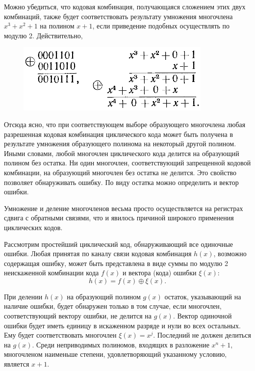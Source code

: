 \documentclass[12pt,a4paper]{article}
\begin{document}
  Можно убедиться, что кодовая комбинация, получающаяся сложением этих двух комбинаций, также будет соответствовать результату умножения многочлена $x^3+x^2+1$ на полином $x+1$, если приведение подобных осуществлять по модулю 2. Действительно,
  \begin{figure}[H]
	  \centering
	  \includegraphics[scale=0.7]{ex_eq}
  \end{figure}
  Отсюда ясно, что при соответствующем выборе образующего многочлена любая разрешенная кодовая комбинация циклического кода может быть получена в результате умножения образующего полинома на некоторый другой полином. Иными словами, любой многочлен циклического кода делится на образующий полином без остатка. Ни один многочлен, соответствующий запрещенной кодовой комбинации, на образующий многочлен без остатка не делится. Это свойство позволяет обнаруживать ошибку. По виду остатка можно определить и вектор ошибки.
  
  Умножение и деление многочленов весьма просто осуществляется на регистрах сдвига с обратными связями, что и явилось причиной широкого применения циклических кодов.
  
  Рассмотрим простейший циклический код, обнаруживающий все одиночные ошибки. Любая принятая по каналу связи кодовая комбинация $h(x)$, возможно содержащая ошибку, может быть представлена в виде суммы по модулю 2 неискаженной комбинации кода $f(x)$ и вектора (кода) ошибки $\xi(x)$:
  \begin{equation}
    \nonumber
    h(x)=f(x)\oplus \xi(x)\text{.}
  \end{equation}
  
  При делении $h(x)$ на образующий полином $g(x)$ остаток, указывающий на наличие ошибки, будет обнаружен только в том случае, если многочлен, соответствующий вектору ошибки, не делится на $g(x)$. Вектор одиночной ошибки будет иметь единицу в искаженном разряде и нули во всех остальных. Ему будет соответствовать многочлен $\xi(x)=x^j$. Последний не должен делиться на $g(x)$. Среди неприводимых полиномов, входящих в разложение $x^n+1$, многочленом наименьше степени, удовлетворяющий указанному условию, является $x+1$.
  
\end{document}
